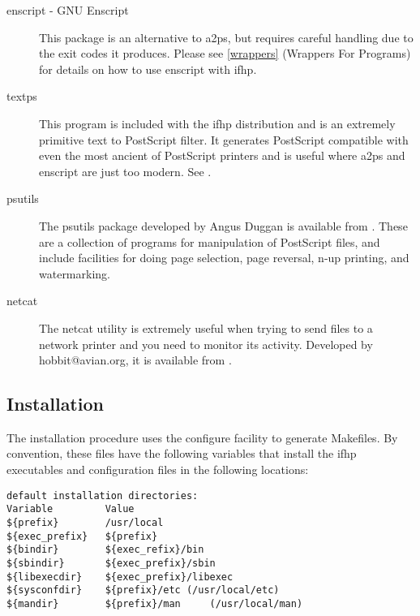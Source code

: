\documentclass[a4paper]{article}
\begin{document}
\begin{description}
\item[enscript - GNU Enscript] \mbox{}

\label{enscript}
This package is an alternative to {\ttfamily a2ps},
but requires careful handling due to the exit codes it produces.
Please see
\ref{wrappers} {(Wrappers For Programs)} for details on how to use
{\ttfamily enscript} with {\ttfamily ifhp}.



\item[textps] \mbox{}

\label{textps}
This program is included with the {\ttfamily ifhp} distribution
and is an extremely primitive text to PostScript filter.
It generates PostScript compatible with even the most ancient
of PostScript printers and is useful where
{\ttfamily a2ps} and {\ttfamily enscript} are just too modern.
See
.



\item[psutils] \mbox{}

\label{psutils}
The {\ttfamily psutils} package
developed by Angus Duggan is available from
.
These are a collection of programs for manipulation of
PostScript files,
and include facilities for doing page selection,
page reversal, n-up printing,  and watermarking.



\item[netcat] \mbox{}

\label{netcat}
The {\ttfamily netcat} utility is extremely useful when trying to
send files to a network printer and you need to monitor its
activity.
Developed by {\ttfamily hobbit@avian.org}, it is available from
.

\end{description}



\subsection{Installation}

The installation procedure uses the {\ttfamily configure}
facility to generate Makefiles.
By convention,
these files have the following variables that install
the {\ttfamily ifhp} executables and configuration files
in the following locations:
\begin{tscreen}
\begin{verbatim}
default installation directories:
Variable         Value
${prefix}        /usr/local
${exec_prefix}   ${prefix}
${bindir}        ${exec_refix}/bin
${sbindir}       ${exec_prefix}/sbin
${libexecdir}    ${exec_prefix}/libexec   
${sysconfdir}    ${prefix}/etc (/usr/local/etc)
${mandir}        ${prefix}/man     (/usr/local/man)
\end{verbatim}
\end{tscreen}
\end{document}
